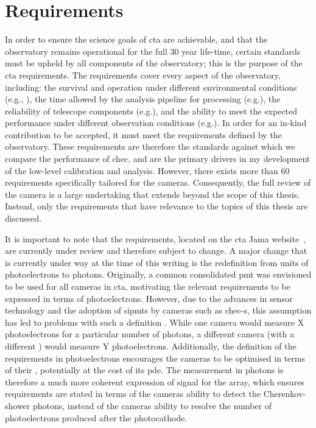 \section{Requirements}

In order to ensure the science goals of \gls{cta} are achievable, and that the observatory remains operational for the full 30 year life-time, certain standards must be upheld by all components of the observatory; this is the purpose of the \gls{cta} requirements. The requirements cover every aspect of the observatory, including: the survival and operation under different environmental conditions (e.g.\@ {}, ), the time allowed by the analysis pipeline for processing (e.g.\@ {}), the reliability of telescope components (e.g.\@ {}), and the ability to meet the expected performance under different observation conditions (e.g.\@ {}). In order for an in-kind contribution to be accepted, it must meet the requirements defined by the observatory. These requirements are therefore the standards against which we compare the performance of \gls{chec}, and are the primary drivers in my development of the low-level calibration and analysis. However, there exists more than 60 requirements specifically tailored for the cameras. Consequently, the full review of the camera is a large undertaking that extends beyond the scope of this thesis. Instead, only the requirements that have relevance to the topics of this thesis are discussed.

It is important to note that the requirements, located on the \gls{cta} Jama website~\cite{cta-jama}, are currently under review and therefore subject to change. A major change that is currently under way at the time of this writing is the redefinition from units of photoelectrons to photons. Originally, a common consolidated \gls{pmt} was envisioned to be used for all cameras in \gls{cta}, motivating the relevant requirements to be expressed in terms of photoelectrons. However, due to the advances in sensor technology and the adoption of \glspl{sipmt} by cameras such as \gls{chec-s}, this assumption has led to problems with such a definition \cite{petophotons}. While one camera would measure X photoelectrons for a particular number of photons, a different camera (with a different ) would measure Y photoelectrons. Additionally, the definition of the requirements in photoelectrons encourages the cameras to be optimised in terms of their , potentially at the cost of its \gls{pde}. The measurement in photons is therefore a much more coherent expression of signal for the array, which ensures requirements are stated in terms of the cameras ability to detect the Cherenkov-shower photons, instead of the cameras ability to resolve the number of photoelectrons produced after the photocathode. 

